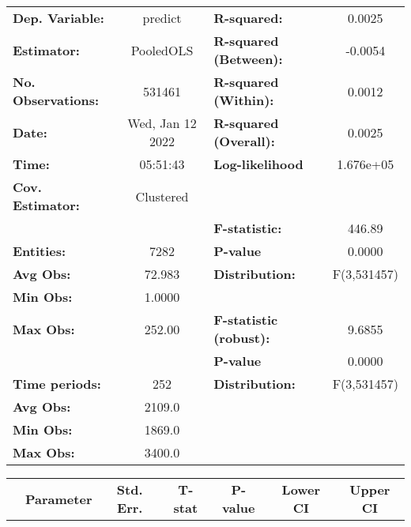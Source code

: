 \begin{center}
\begin{tabular}{lclc}
\toprule
\textbf{Dep. Variable:}    &      predict       & \textbf{  R-squared:         }   &      0.0025      \\
\textbf{Estimator:}        &     PooledOLS      & \textbf{  R-squared (Between):}  &     -0.0054      \\
\textbf{No. Observations:} &       531461       & \textbf{  R-squared (Within):}   &      0.0012      \\
\textbf{Date:}             &  Wed, Jan 12 2022  & \textbf{  R-squared (Overall):}  &      0.0025      \\
\textbf{Time:}             &      05:51:43      & \textbf{  Log-likelihood     }   &    1.676e+05     \\
\textbf{Cov. Estimator:}   &     Clustered      & \textbf{                     }   &                  \\
\textbf{}                  &                    & \textbf{  F-statistic:       }   &      446.89      \\
\textbf{Entities:}         &        7282        & \textbf{  P-value            }   &      0.0000      \\
\textbf{Avg Obs:}          &       72.983       & \textbf{  Distribution:      }   &   F(3,531457)    \\
\textbf{Min Obs:}          &       1.0000       & \textbf{                     }   &                  \\
\textbf{Max Obs:}          &       252.00       & \textbf{  F-statistic (robust):} &      9.6855      \\
\textbf{}                  &                    & \textbf{  P-value            }   &      0.0000      \\
\textbf{Time periods:}     &        252         & \textbf{  Distribution:      }   &   F(3,531457)    \\
\textbf{Avg Obs:}          &       2109.0       & \textbf{                     }   &                  \\
\textbf{Min Obs:}          &       1869.0       & \textbf{                     }   &                  \\
\textbf{Max Obs:}          &       3400.0       & \textbf{                     }   &                  \\
\bottomrule
\end{tabular}
\begin{tabular}{lcccccc}
                & \textbf{Parameter} & \textbf{Std. Err.} & \textbf{T-stat} & \textbf{P-value} & \textbf{Lower CI} & \textbf{Upper CI}  \\

\end{tabular}
\end{center}
